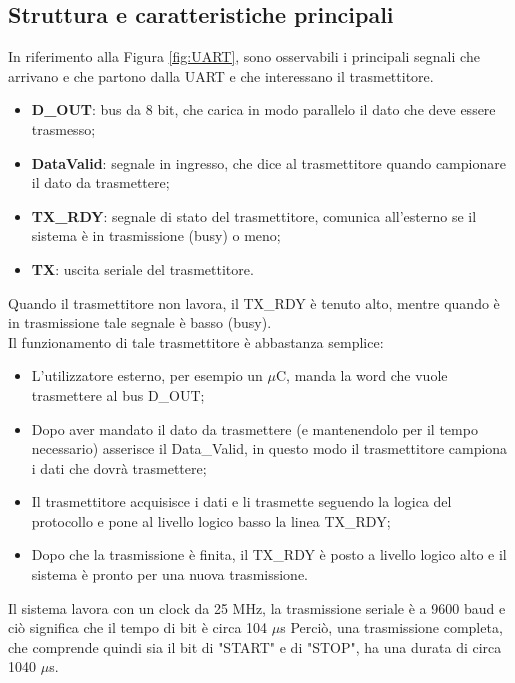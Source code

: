 \documentclass[a4paper, titlepage]{article}
\begin{document}
\subsection{Struttura e caratteristiche principali}
In riferimento alla Figura \ref{fig:UART}, sono osservabili i principali segnali che arrivano e che partono dalla UART e che interessano il trasmettitore.
\begin{itemize}
\item \textbf{D\_OUT}: bus da 8 bit, che carica in modo parallelo il dato che deve essere trasmesso;
\item \textbf{Data\textunderscore Valid}: segnale in ingresso, che dice al trasmettitore quando campionare il dato da trasmettere;
\item \textbf{TX\_RDY}: segnale di stato del trasmettitore, comunica all'esterno se il sistema è in trasmissione (busy) o meno;
\item \textbf{TX}: uscita seriale del trasmettitore.
\end{itemize}
Quando il trasmettitore non lavora, il TX\_RDY è tenuto alto, mentre quando è in trasmissione tale segnale è basso (busy).\\Il funzionamento di tale trasmettitore è abbastanza semplice:
\begin{itemize}
\item L'utilizzatore esterno, per esempio un $\mu$C, manda la word che vuole trasmettere al bus D\_OUT;
\item Dopo aver mandato il dato da trasmettere (e mantenendolo per il tempo necessario)  asserisce il Data\_Valid, in questo modo il trasmettitore campiona i dati che dovrà trasmettere;
\item Il trasmettitore acquisisce i dati e li trasmette seguendo la logica del protocollo e pone al livello logico basso la linea TX\_RDY;
\item Dopo che la trasmissione è finita, il TX\_RDY è posto a livello logico alto e il sistema è pronto per una nuova trasmissione.
\end{itemize}
Il sistema lavora con un clock da 25 MHz, la trasmissione seriale è a 9600 baud e ciò significa che il tempo di bit è circa 104 $\mu$s Perciò, una trasmissione completa, che comprende quindi sia il bit di "START" e di "STOP", ha una durata di circa 1040 $\mu$s.
\end{document}
